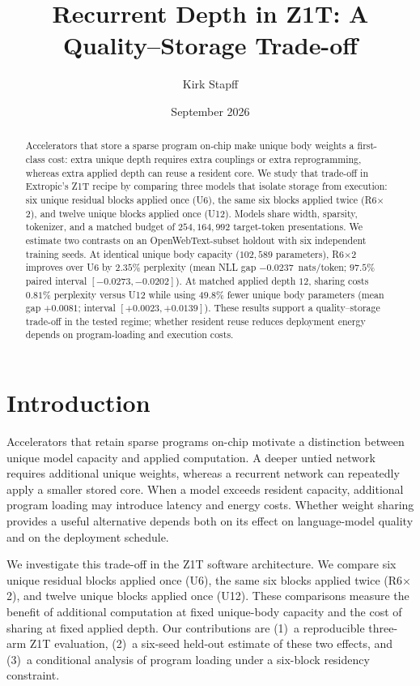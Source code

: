 \documentclass{article}
\title{Recurrent Depth in Z1T: A Quality--Storage Trade-off}
\author{Kirk Stapff}
\date{September 2026}
\begin{document}
\maketitle

\begin{abstract}
Accelerators that store a sparse program on-chip make unique body weights a first-class cost: extra unique depth requires extra couplings or extra reprogramming, whereas extra applied depth can reuse a resident core. We study that trade-off in Extropic's Z1T recipe by comparing three models that isolate storage from execution: six unique residual blocks applied once (U6), the same six blocks applied twice (R6$\times$2), and twelve unique blocks applied once (U12). Models share width, sparsity, tokenizer, and a matched budget of $254{,}164{,}992$ target-token presentations. We estimate two contrasts on an OpenWebText-subset holdout with six independent training seeds. At identical unique body capacity ($102{,}589$ parameters), R6$\times$2 improves over U6 by $2.35\%$ perplexity (mean NLL gap $-0.0237$~nats/token; $97.5\%$ paired interval $[-0.0273,-0.0202]$). At matched applied depth $12$, sharing costs $0.81\%$ perplexity versus U12 while using $49.8\%$ fewer unique body parameters (mean gap $+0.0081$; interval $[+0.0023,+0.0139]$). These results support a quality--storage trade-off in the tested regime; whether resident reuse reduces deployment energy depends on program-loading and execution costs.
\end{abstract}

\section{Introduction}

Accelerators that retain sparse programs on-chip motivate a distinction between unique model capacity and applied computation. A deeper untied network requires additional unique weights, whereas a recurrent network can repeatedly apply a smaller stored core. When a model exceeds resident capacity, additional program loading may introduce latency and energy costs. Whether weight sharing provides a useful alternative depends both on its effect on language-model quality and on the deployment schedule.

We investigate this trade-off in the Z1T software architecture. We compare six unique residual blocks applied once (U6), the same six blocks applied twice (R6$\times$2), and twelve unique blocks applied once (U12). These comparisons measure the benefit of additional computation at fixed unique-body capacity and the cost of sharing at fixed applied depth. Our contributions are (1)~a reproducible three-arm Z1T evaluation, (2)~a six-seed held-out estimate of these two effects, and (3)~a conditional analysis of program loading under a six-block residency constraint.
\end{document}

